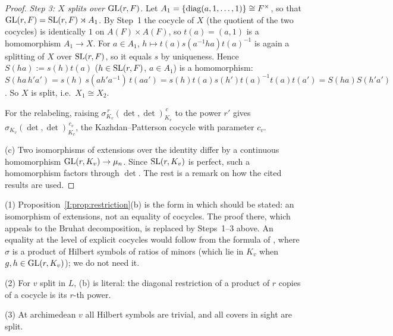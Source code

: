 \begin{proof}
\emph{Step 3: $X$ splits over $\mathrm{GL}(r,F)$.} Let $A_1=\{\operatorname{diag}(a,1,\dots,1)\}\cong F^\times$, so that $\mathrm{GL}(r,F)=\mathrm{SL}(r,F)\rtimes A_1$. By Step~1 the cocycle of $X$ (the quotient of the two cocycles) is identically $1$ on $A(F)\times A(F)$, so $t(a)=(a,1)$ is a homomorphism $A_1\to X$. For $a\in A_1$, $h\mapsto t(a)s(a^{-1}ha)t(a)^{-1}$ is again a splitting of $X$ over $\mathrm{SL}(r,F)$, so it equals $s$ by uniqueness. Hence $S(ha):=s(h)t(a)$ ($h\in\mathrm{SL}(r,F)$, $a\in A_1$) is a homomorphism: $S(ha\,h'a')=s(h)\,s(ah'a^{-1})\,t(aa')=s(h)t(a)s(h')t(a)^{-1}t(a)t(a')=S(ha)S(h'a')$. So $X$ is split, i.e.\ $X_1\cong X_2$.

For the relabeling, raising $\sigma_{K_v}^{\,r}(\det,\det)_{K_v}^{\,c}$ to the power $r'$ gives $\sigma_{K_v}(\det,\det)_{K_v}^{\,c_v}$, the Kazhdan--Patterson cocycle with parameter $c_v$.

(c) Two isomorphisms of extensions over the identity differ by a continuous homomorphism $\mathrm{GL}(r,K_v)\to\mu_n$. Since $\mathrm{SL}(r,K_v)$ is perfect, such a homomorphism factors through $\det$. The rest is a remark on how the cited results are used.
\end{proof}

\begin{remark}\label{I:rem:JC61c}
(1) Proposition~\ref{I:prop:restriction}(b) is the form in which \cite[Lemma~6.1(c)]{JC26a} should be stated: an isomorphism of extensions, not an equality of cocycles. The proof there, which appeals to the Bruhat decomposition, is replaced by Steps~1--3 above. An equality at the level of explicit cocycles would follow from the formula of \cite{BLS99}, where $\sigma$ is a product of Hilbert symbols of ratios of minors (which lie in $K_v$ when $g,h\in\mathrm{GL}(r,K_v)$); we do not need it.

(2) For $v$ split in $L$, (b) is literal: the diagonal restriction of a product of $r$ copies of a cocycle is its $r$-th power.

(3) At archimedean $v$ all Hilbert symbols are trivial, and all covers in sight are split.
\end{remark}

